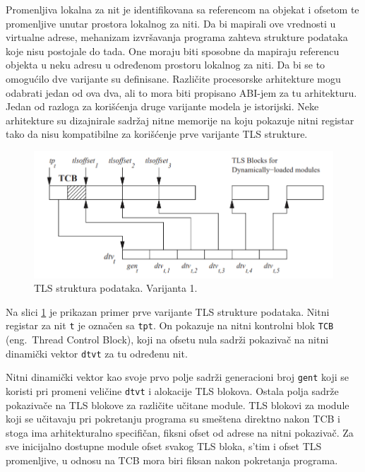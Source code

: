 \documentclass[12pt,oneside]{memoir}
\begin{document}
Promenljiva lokalna za nit je identifikovana sa referencom na objekat i ofsetom te promenljive unutar prostora lokalnog za niti. Da bi mapirali ove vrednosti u virtualne adrese, mehanizam izvršavanja programa zahteva strukture podataka koje nisu postojale do tada. One moraju biti sposobne da mapiraju referencu objekta u neku adresu u određenom prostoru lokalnog za niti. Da bi se to omogućilo dve varijante su definisane. Različite procesorske arhitekture mogu odabrati jedan od ova dva, ali to mora biti propisano ABI-jem za tu arhitekturu. Jedan od razloga za korišćenja druge varijante modela je istorijski. Neke arhitekture su dizajnirale sadržaj nitne memorije na koju pokazuje nitni registar tako da nisu kompatibilne za korišćenje prve varijante TLS strukture.

\begin{figure}[h!]
	\begin{center}
		\includegraphics[scale=0.6]{slike/TLSModelV1.png}
	\end{center}
	\caption{TLS struktura podataka. Varijanta 1.}
	\label{fig:tls_model1}
\end{figure}

Na slici \ref{fig:tls_model1} je prikazan primer prve varijante TLS strukture podataka. Nitni registar za nit \texttt{t} je označen sa \texttt{tpt}. On pokazuje na nitni kontrolni blok \texttt{TCB} (eng.~Thread Control Block), koji na ofsetu nula sadrži pokazivač na nitni dinamički vektor \texttt{dtvt} za tu određenu nit.

Nitni dinamički vektor kao svoje prvo polje sadrži generacioni broj \texttt{gent} koji se koristi pri promeni veličine \texttt{dtvt} i alokacije TLS blokova. Ostala polja sadrže pokazivače na TLS blokove za različite učitane module. TLS blokovi za module koji se učitavaju pri pokretanju programa su smeštena direktno nakon TCB i stoga ima arhitekturalno specifičan, fiksni ofset od adrese na nitni pokazivač. Za sve inicijalno dostupne module ofset svakog TLS bloka, s'tim i ofset TLS promenljive, u odnosu na TCB mora biri fiksan nakon pokretanja programa.
\end{document}
